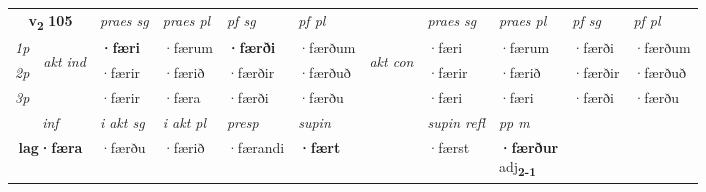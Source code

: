 \noindent
\begin{tabular}{lllllllllll} \toprule
\multicolumn{2}{c}{\textbf{v{\textsubscript{2}}} \Large{\textbf{105}}}  &  \textit{praes sg}  & \textit{praes pl}  &\textit{ pf sg} & \textit{pf pl} &  &  \textit{praes sg}  & \textit{praes pl}  & \textit{pf sg} & \textit{pf pl } \\*
	\cmidrule{3-6} \cmidrule{8-11}
 {\textit{1p}} & \multirow{3}{*}{\begin{turn}{90}\textit{akt ind}\end{turn}} & \textbf{·færi} & ·færum & \textbf{·færði} & ·færðum & \multirow{3}{*}{\begin{turn}{90}\textit{akt con}\end{turn}} &·færi & ·færum & ·færði & ·færðum\\*
 {\textit{2p}} &  &  ·færir  & ·færið & ·færðir & ·færðuð & & ·færir & ·færið & ·færðir & ·færðuð \\*
{\textit{3p}} &  & ·færir & ·færa & ·færði & ·færðu & & ·færi & ·færi& ·færði & ·færðu \\*
\cmidrule{3-6} \cmidrule{8-11}

   \multicolumn{2}{c}{\textit{inf}}  & \textit{i akt sg} & \textit{i akt pl}   & \textit{presp} & \textit{supin} && \textit{supin refl} & \textit{pp m} \\*
  \multicolumn{2}{c}{\textbf{lag\allowbreak ·færa}} & ·færðu  & ·færið   & ·færandi &  \textbf{·fært} && ·færst & \specialcell{\textbf{·færður} \\ adj\textbf{\textsubscript{2-1}}} \\*
\end{tabular}


